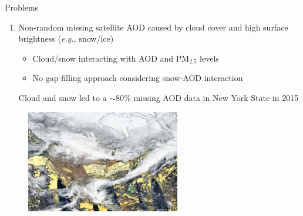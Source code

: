\documentclass[handout]{beamer} %
\begin{document}
\begin{frame}{Problems}
    \begin{enumerate}
        \item<1> Non-random missing satellite AOD caused by cloud cover and high surface brightness (\textit{e.g.,} snow/ice) 
            \begin{itemize}
                \item \textcolor[rgb]{1,0.4,0}{Cloud/snow interacting with AOD and PM$_{2.5}$ levels}
                \item \textcolor[rgb]{1,0.4,0}{No gap-filling approach considering snow-AOD interaction}
            \end{itemize}
        \textcolor[rgb]{0.1,0.1,0.6}{Cloud and snow led to a $\sim$80\% missing AOD data in New York State in 2015}
    \end{enumerate}
    \vspace{-0.1cm}
    \begin{figure}
        \centering
        \includegraphics[width=0.6\textwidth]{img/missing.jpg}
    \end{figure}
\end{frame}
\end{document}
